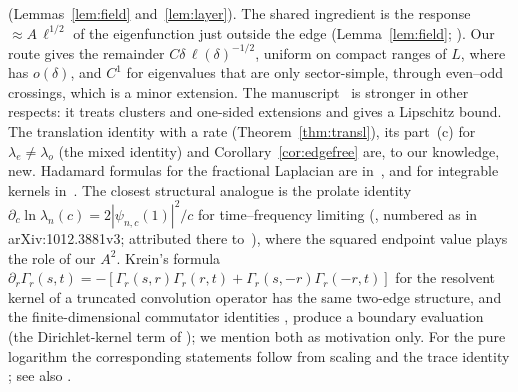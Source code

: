 \documentclass[11pt]{amsart}
\theoremstyle{definition}
\theoremstyle{remark}
\numberwithin{equation}{section}
\begin{document}
(Lemmas~\ref{lem:field} and~\ref{lem:layer}). The shared ingredient is the response $\approx A\,\ell^{1/2}$ of the eigenfunction just outside the edge (Lemma~\ref{lem:field}; \cite[(4.7)]{BT26}). Our route gives the remainder $C\delta\,\ell(\delta)^{-1/2}$, uniform on compact ranges of $L$, where \cite{BT26} has $o(\delta)$, and $C^1$ for eigenvalues that are only sector-simple, through even--odd crossings, which is a minor extension. The manuscript~\cite{BT26} is stronger in other respects: it treats clusters and one-sided extensions and gives a Lipschitz bound. The translation identity with a rate (Theorem~\ref{thm:transl}), its part~(c) for $\lambda_e\ne\lambda_o$ (the mixed identity) and Corollary~\ref{cor:edgefree} are, to our knowledge, new. Hadamard formulas for the fractional Laplacian are in~\cite{DFW21,DFW24}, and for integrable kernels in~\cite{BPS24}. The closest structural analogue is the prolate identity $\partial_c\ln\lambda_n(c)=2|\psi_{n,c}(1)|^2/c$ for time--frequency limiting (\cite[eq.~(43)]{BK17}, numbered as in arXiv:1012.3881v3; attributed there to~\cite{XRY01}), where the squared endpoint value plays the role of our $A^2$. Krein's formula $\partial_r\Gamma_r(s,t)=-[\Gamma_r(s,r)\Gamma_r(r,t)+\Gamma_r(s,-r)\Gamma_r(-r,t)]$ for the resolvent kernel of a truncated convolution operator \cite[Lemma~2.3]{Den06} has the same two-edge structure, and the finite-dimensional commutator identities \cite[Lemma~5.2]{CCM25}, \cite[Lemma~5.1]{CvS} produce a boundary evaluation (the Dirichlet-kernel term of \cite[Thm.~1.1]{CCM25}); we mention both as motivation only. For the pure logarithm the corresponding statements follow from scaling and the trace identity \cite[Cor.~2.3]{BT26}; see also \cite[Rem.~1.3, Cor.~1.5]{BPL}.
\end{document}
